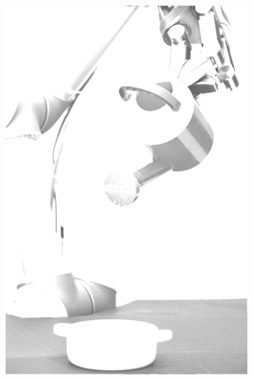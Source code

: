 \begin{figure}[H]
\begin{subfigure}[b]{0.1\textwidth}
        \includegraphics[width=\textwidth]{img3/test/contrast_5_1_8_final_img3.png}
    \end{subfigure}
        \begin{subfigure}[b]{0.1\textwidth}

\end{subfigure}
\end{figure}

